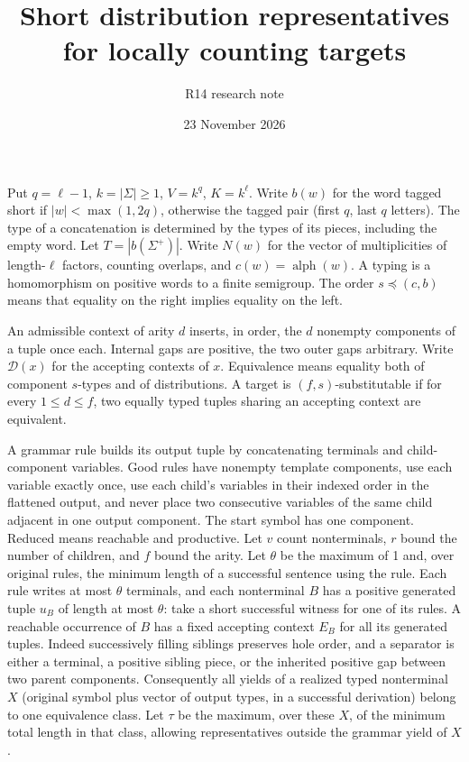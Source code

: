 \documentclass[11pt]{article}
\newcommand{\wordalph}{\operatorname{alph}}
\newcommand{\Dist}{\mathcal D}
\begin{document}
\title{Short distribution representatives for locally counting targets}
\author{R14 research note}\date{23 November 2026}\maketitle

Put $q=\ell-1$, $k=|\Sigma|\ge1$, $V=k^q$, $K=k^\ell$.
Write $b(w)$ for the word tagged short if $|w|<\max(1,2q)$, otherwise
the tagged pair (first $q$, last $q$ letters). The type of a concatenation is
determined by the types of its pieces, including the empty word.
Let $T=|b(\Sigma^+)|$. Write $N(w)$ for the vector of multiplicities of
length-$\ell$ factors, counting overlaps, and $c(w)=\wordalph(w)$.
A typing is a homomorphism on positive words to a finite semigroup.
The order $s\preceq(c,b)$ means that equality on the right implies equality on the left.

An admissible context of arity $d$ inserts, in order, the $d$ nonempty
components of a tuple once each. Internal gaps are positive, the two
outer gaps arbitrary. Write $\Dist(x)$ for the accepting contexts of $x$.
Equivalence means equality both of component $s$-types and of distributions.
A target is $(f,s)$-substitutable if for every $1\le d\le f$,
two equally typed tuples sharing an accepting context are equivalent.

A grammar rule builds its output tuple by concatenating terminals and
child-component variables. Good rules have nonempty template components,
use each variable exactly once, use each child's variables in their indexed
order in the flattened output, and never place two consecutive variables of the
same child adjacent in one output component. The start symbol has one component.
Reduced means reachable and productive. Let $v$ count nonterminals, $r$ bound
the number of children, and $f$ bound the arity. Let $\theta$ be the maximum
of 1 and, over original rules, the minimum length of a successful sentence
using the rule. Each rule writes at most $\theta$ terminals, and each
nonterminal $B$ has a positive generated tuple $u_B$ of length at most
$\theta$: take a short successful witness for one of its rules.
A reachable occurrence of $B$ has a fixed accepting context $E_B$ for all
its generated tuples. Indeed successively filling siblings preserves hole
order, and a separator is either a terminal, a positive sibling piece, or
the inherited positive gap between two parent components. Consequently all
yields of a realized typed nonterminal $X$ (original symbol plus vector of
output types, in a successful derivation) belong to one equivalence class.
Let $\tau$ be the maximum, over these $X$, of the minimum total length
in that class, allowing representatives outside the grammar yield of $X$.
\end{document}
